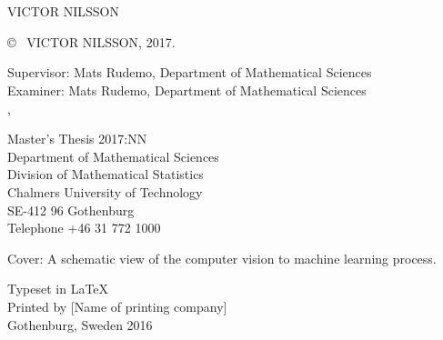 \newpage
\thispagestyle{plain}
\vspace*{4.5cm}
\titlename\\
\subtitlename\\
VICTOR NILSSON \setlength{\parskip}{1cm}

\copyright ~ VICTOR NILSSON, 2017. \setlength{\parskip}{1cm}

Supervisor: Mats Rudemo, Department of Mathematical Sciences\\
Examiner: Mats Rudemo, Department of Mathematical Sciences\\
,
 \setlength{\parskip}{1cm}

Master's Thesis 2017:NN\\	%
Department of Mathematical Sciences\\
Division of Mathematical Statistics\\
Chalmers University of Technology\\
SE-412 96 Gothenburg\\
Telephone +46 31 772 1000 \setlength{\parskip}{0.5cm}

\vfill
Cover: A schematic view of the computer vision to machine learning process. %

Typeset in \LaTeX \\
Printed by [Name of printing company]\\
Gothenburg, Sweden 2016
